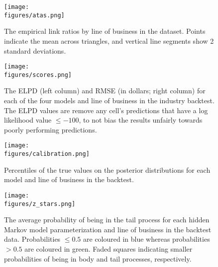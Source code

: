 \begin{figure}
    \centering
    \texttt{[image: \\figures/atas.png]}
    \caption{
        The empirical link ratios by line of business in
        the \cite{meyers2015} dataset.
        Points indicate the mean across triangles,
        and vertical line segments show 2 standard
        deviations.
    }
\end{figure}

\begin{figure}
    \centering
    \texttt{[image: \\figures/scores.png]}
    \caption{
        The ELPD (left column) and RMSE (in dollars; right column)
        for each of the four models and line of business
        in the industry backtest. The ELPD values are remove
		any cell's predictions that have a log likelihood value
		$\leq -100$, to not bias the results unfairly towards poorly
		performing predictions.
    }
\end{figure}


\begin{figure}
    \centering
    \texttt{[image: \\figures/calibration.png]}
    \caption{
        Percentiles of the true values on the posterior distributions
        for each model and line of business in the backtest.
    }
\end{figure}

\begin{figure}
    \centering
    \texttt{[image: \\figures/z\_stars.png]}
    \caption{
        The average probability of being in the tail process
        for each hidden Markov model parameterization
        and line of business in the backtest data.
        Probabilities $\leq 0.5$ are coloured
        in blue whereas probabilities $> 0.5$
        are coloured in green. Faded squares
        indicating smaller probabilities of being
        in body and tail processes, respectively.
    }
\end{figure}
